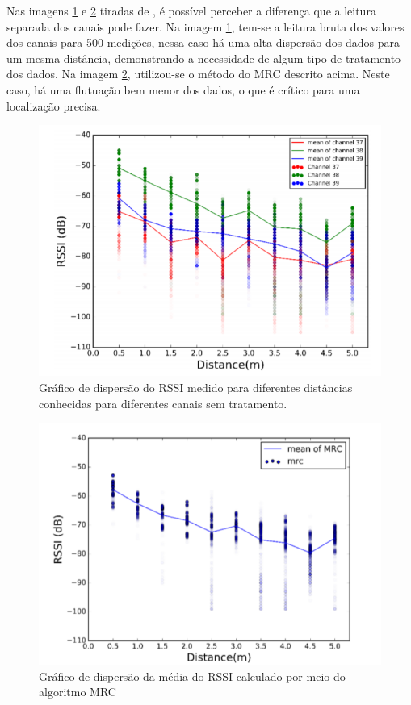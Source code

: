 Nas imagens \ref{fig:rssi_channels_raw.png} e \ref{fig:rssi_channels_mrc.png} tiradas de \cite{art17}, é possível perceber a diferença que a leitura separada dos canais pode fazer. Na imagem \ref{fig:rssi_channels_raw.png}, tem-se a leitura bruta dos valores dos canais para 500 medições, nessa caso há uma alta dispersão dos dados para um mesma distância, demonstrando a necessidade de algum tipo de tratamento dos dados.
Na imagem \ref{fig:rssi_channels_mrc.png}, utilizou-se o método do MRC descrito acima. Neste caso, há uma flutuação bem menor dos dados, o que é crítico para uma localização precisa.

\begin{figure}[H]
    \centering
    \includegraphics[scale = 1]{images/rssi_channels_raw.png}
    \caption{Gráfico de dispersão do RSSI medido para diferentes distâncias conhecidas para diferentes canais sem tratamento.  \cite{art17}}
    \label{fig:rssi_channels_raw.png}
\end{figure}

\begin{figure}[H]
    \centering
    \includegraphics[scale = 1]{images/rssi_channels_mrc.png}
    \caption{Gráfico de dispersão da média do RSSI calculado por meio do algoritmo MRC \cite{art17}}
    \label{fig:rssi_channels_mrc.png}
\end{figure}




